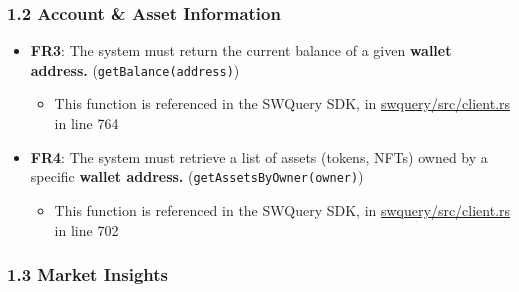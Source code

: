 \documentclass[
]{article}
\providecommand{\tightlist}{%
  \setlength{\itemsep}{0pt}\setlength{\parskip}{0pt}}
\begin{document}
\hypertarget{account-asset-information}{%
\subsubsection{\texorpdfstring{\textbf{1.2 Account \& Asset
Information}}{1.2 Account \& Asset Information}}\label{account-asset-information}}

\begin{itemize}
\tightlist
\item
  \textbf{FR3}: The system must return the current balance of a given
  \textbf{wallet address.} (\texttt{getBalance(address)})

  \begin{itemize}
  \tightlist
  \item
    This function is referenced in the SWQuery SDK, in
    \href{https://github.com/SWQuery/swquery/blob/main/swquery/src/client.rs}{swquery/src/client.rs}
    in line 764
  \end{itemize}
\item
  \textbf{FR4}: The system must retrieve a list of assets (tokens, NFTs)
  owned by a specific \textbf{wallet address.}
  (\texttt{getAssetsByOwner(owner)})

  \begin{itemize}
  \tightlist
  \item
    This function is referenced in the SWQuery SDK, in
    \href{https://github.com/SWQuery/swquery/blob/main/swquery/src/client.rs}{swquery/src/client.rs}
    in line 702
  \end{itemize}
\end{itemize}

\hypertarget{market-insights}{%
\subsubsection{\texorpdfstring{\textbf{1.3 Market
Insights}}{1.3 Market Insights}}\label{market-insights}}
\end{document}
